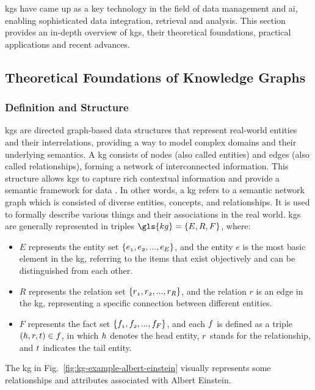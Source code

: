\glspl{kg} have came up as a key technology in the field of data management and \gls{ai}, enabling sophisticated data integration, retrieval and analysis.
This section provides an in-depth overview of \glspl{kg}, their theoretical foundations, practical applications and recent advances.

\subsection*{Theoretical Foundations of Knowledge Graphs}
\subsubsection*{Definition and Structure}
\glspl{kg} are directed graph-based data structures that represent real-world entities and their interrelations, providing a way to model complex domains and their underlying semantics.
A \gls{kg} consists of nodes (also called entities) and edges (also called relationships), forming a network of interconnected information.
This structure allows \glspl{kg} to capture rich contextual information and provide a semantic framework for data \cite{Hogan2021}.
In other words, a \gls{kg} refers to a semantic network graph which is consisted of diverse entities, concepts, and relationships.
It is used to formally describe various things and their associations in the real world.
\glspl{kg} are generally represented in triples $\gls{kg}=\{\mathnormal{E,R,F}\}$, where:
\begin{itemize}
    \item $E$ represents the entity set $\{\mathnormal{e_1, e_2, ... ,e_E} \}$, and the entity $e$ is the most basic element in the \gls{kg}, referring to the items that exist objectively and can be distinguished from each other.
    \item $R$ represents the relation set $\{\mathnormal{r_1, r_2, ... ,r_R}\}$, and the relation $r$ is an edge in the \gls{kg}, representing a specific connection between different entities.
    \item $F$ represents the fact set $\{\mathnormal{f_1,f_2, ... ,f_F}\}$, and each $\mathnormal{f}$ is defined as a triple $(\mathnormal{h,r,t}) \in \mathnormal{f}$, in which $\mathnormal{h}$ denotes the head entity, $\mathnormal{r}$ stands for the relationship, and $\mathnormal{t}$ indicates the tail entity.
\end{itemize}

The \gls{kg} in Fig.~\ref{fig:kg-example-albert-einstein} visually represents some relationships and attributes associated with Albert Einstein.

